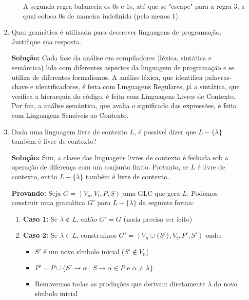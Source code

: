 \documentclass[12pt]{article}
\begin{document}
\begin{enumerate}
\begin{enumerate}[label=\alph*)]
		            A segunda regra balanceia os 0s e 1s, até que se "escape" para a regra 3, a qual coloca 0s de maneira indefinida (pelo menos 1).
	      \end{enumerate}
	      
	\item Qual gramática é utilizada para descrever linguagens de programação. Justifique sua resposta.
	      
	      \textbf{Solução:}
	      Cada fase da análise em compiladores (léxica, sintática e semântica) lida com diferentes aspectos da linguagem de programação e se utiliza de diferentes formalismos. A análise léxica, que identifica palavras-chave e identificadores, é feita com Linguagens Regulares, já a sintática, que verifica a hierarquia do código, é feita com Linguagens Livres de Contexto. Por fim, a análise semântica, que avalia o significado das expressões, é feita com Linguagens Sensíveis ao Contexto.
	      
	\item Dada uma linguagem livre de contexto $L$, é possível dizer que $L - \{\lambda\}$ também é livre de contexto?
	      
	      \textbf{Solução:} Sim, a classe das linguagens livres de contexto é fechada sob a operação de diferença com um conjunto finito. Portanto, se $L$ é livre de contexto, então $L - \{\lambda\}$ também é livre de contexto.
	      
	      \textbf{Provando:} Seja $G = (V_n, V_t, P, S)$ uma GLC que gera $L$. Podemos construir uma gramática $G'$ para $L - \{\lambda\}$ da seguinte forma:
	      
	      \begin{enumerate}
		      \item \textbf{Caso 1:} Se $\lambda \notin L$, então $G' = G$ (nada precisa ser feito)
		            
		      \item \textbf{Caso 2:} Se $\lambda \in L$, construímos $G' = (V_n \cup \{S'\}, V_t, P', S')$ onde:
		            \begin{itemize}
			            \item $S'$ é um novo símbolo inicial ($S' \notin V_n$)
			            \item $P' = P \cup \{S' \rightarrow \alpha \mid S \rightarrow \alpha \in P \text{ e } \alpha \neq \lambda\}$
			            \item Removemos todas as produções que derivam diretamente $\lambda$ do novo símbolo inicial
		            \end{itemize}
	      \end{enumerate}
\end{enumerate}
\end{document}
